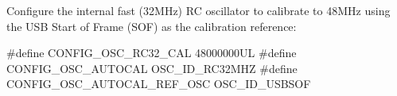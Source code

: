\begin{DoxyEnumerate}
\item Configure the internal fast (32\-M\-Hz) R\-C oscillator to calibrate to 48\-M\-Hz using the U\-S\-B Start of Frame (S\-O\-F) as the calibration reference\-: 
\begin{DoxyCode}
\textcolor{preprocessor}{        #define CONFIG\_OSC\_RC32\_CAL         48000000UL}
\textcolor{preprocessor}{}\textcolor{preprocessor}{        #define CONFIG\_OSC\_AUTOCAL          OSC\_ID\_RC32MHZ}
\textcolor{preprocessor}{        #define CONFIG\_OSC\_AUTOCAL\_REF\_OSC  OSC\_ID\_USBSOF}
\end{DoxyCode}
 
\end{DoxyEnumerate}